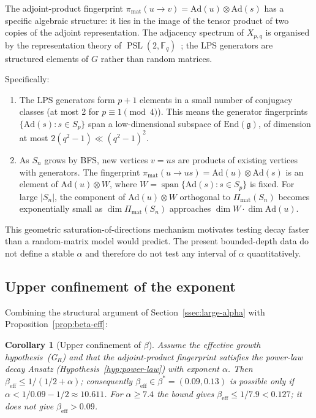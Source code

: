 \documentclass[11pt]{article}
\newtheorem{corollary}[theorem]{Corollary}
\theoremstyle{definition}
\theoremstyle{remark}
\DeclareMathOperator{\spn}{span}
\DeclareMathOperator{\PSL}{PSL}
\newcommand{\F}{\mathbb{F}}
\newcommand{\beff}{\beta_{\mathrm{eff}}}
\begin{document}
    The adjoint-product fingerprint $\pi_{\mathrm{mat}}(u \to v) = \mathrm{Ad}(u) \otimes \mathrm{Ad}(s)$
    has a specific algebraic structure: it lies in the image of the tensor product of two
    copies of the adjoint representation.
    The adjacency spectrum of $X_{p,q}$ is organised by the representation theory of
    $\PSL(2, \F_q)$~\cite{LPS88}; the LPS generators are structured elements of $G$
    rather than random matrices.

    Specifically:
    \begin{enumerate}[label=(\arabic*)]
\item The LPS generators form $p+1$ elements in a small number of conjugacy classes
(at most 2 for $p \equiv 1 \pmod 4$). This means the generator fingerprints
$\{ \mathrm{Ad}(s) : s \in S_p \}$ span a low-dimensional subspace of
$\mathrm{End}(\mathfrak{g})$, of dimension at most $2(q^2-1) \ll (q^2-1)^2$.

\item As $S_n$ grows by BFS, new vertices $v = us$ are products of existing vertices
with generators.
The fingerprint $\pi_{\mathrm{mat}}(u \to us) = \mathrm{Ad}(u) \otimes \mathrm{Ad}(s)$
is an element of $\mathrm{Ad}(u) \otimes W$, where $W = \spn\{ \mathrm{Ad}(s) : s \in S_p\}$
is fixed.
For large $|S_n|$, the component of $\mathrm{Ad}(u) \otimes W$ orthogonal to
$\Pi_{\mathrm{mat}}(S_n)$ becomes exponentially small as $\dim \Pi_{\mathrm{mat}}(S_n)$
approaches $\dim W \cdot \dim \mathrm{Ad}(u)$.
    \end{enumerate}

    This geometric saturation-of-directions mechanism motivates testing decay faster than a
    random-matrix model would predict.
    The present bounded-depth data do not define a stable $\alpha$ and therefore do not test any
    interval of $\alpha$ quantitatively.

  \subsection{Upper confinement of the exponent}
    \label{ssec:confinement}

    Combining the structural argument of Section~\ref{ssec:large-alpha} with
    Proposition~\ref{prop:beta-eff}:

    \begin{corollary}[Upper confinement of $\beta$]
      \label{cor:confinement}
      Assume the effective growth hypothesis~(G$_R$) and that the adjoint-product fingerprint
      satisfies the power-law decay Ansatz (Hypothesis~\ref{hyp:power-law}) with exponent $\alpha$.
      Then $\beff \leq 1/(1/2+\alpha)$; consequently $\beff \in \beta^* = (0.09, 0.13)$ is possible only
      if $\alpha < 1/0.09 - 1/2 \approx 10.611$.
      For $\alpha \geq 7.4$ the bound gives $\beff \leq 1/7.9 < 0.127$; it does not give $\beff > 0.09$.
    \end{corollary}
\end{document}
